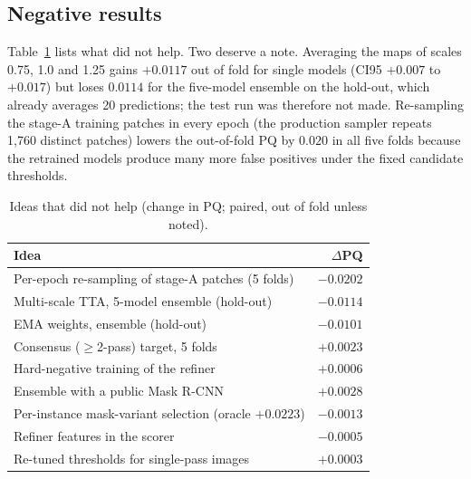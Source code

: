 \documentclass[sigconf]{acmart}
\begin{document}
\subsection{Negative results}
Table~\ref{tab:neg} lists what did not help. Two deserve a note. Averaging the maps of scales 0.75, 1.0 and 1.25 gains $+0.0117$ out of fold for single models (CI95 $+0.007$ to $+0.017$) but loses $0.0114$ for the five-model ensemble on the hold-out, which already averages 20 predictions; the test run was therefore not made. Re-sampling the stage-A training patches in every epoch (the production sampler repeats 1,760 distinct patches) lowers the out-of-fold PQ by $0.020$ in all five folds because the retrained models produce many more false positives under the fixed candidate thresholds.

\begin{table}[t]
\centering
\caption{Ideas that did not help (change in PQ; paired, out of fold unless noted).}
\label{tab:neg}
\small
\begin{tabular}{@{}p{5.7cm}r@{}}
\toprule
Idea & $\Delta$PQ\\
\midrule
Per-epoch re-sampling of stage-A patches (5 folds) & $-0.0202$\\
Multi-scale TTA, 5-model ensemble (hold-out) & $-0.0114$\\
EMA weights, ensemble (hold-out) & $-0.0101$\\
Consensus ($\ge$2-pass) target, 5 folds & $+0.0023$\\
Hard-negative training of the refiner & $+0.0006$\\
Ensemble with a public Mask R-CNN & $+0.0028$\\
Per-instance mask-variant selection (oracle $+0.0223$) & $-0.0013$\\
Refiner features in the scorer & $-0.0005$\\
Re-tuned thresholds for single-pass images & $+0.0003$\\
\bottomrule
\end{tabular}
\end{table}
\end{document}
